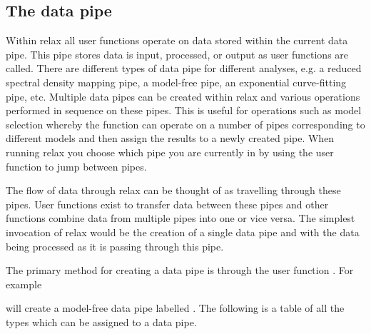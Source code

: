 
\subsection{The data pipe} \label{sect: the data pipe}

Within relax all user functions operate on data stored within the current data pipe.  This pipe stores data is input, processed, or output as user functions are called.  There are different types of data pipe for different analyses, e.g. a reduced spectral density mapping pipe, a model-free pipe, an exponential curve-fitting pipe, etc.  Multiple data pipes can be created within relax and various operations performed in sequence on these pipes.  This is useful for operations such as model selection whereby the function  can operate on a number of pipes corresponding to different models and then assign the results to a newly created pipe.  When running relax you choose which pipe you are currently in by using the  user function to jump between pipes. 

The flow of data through relax can be thought of as travelling through these pipes.  User functions exist to transfer data between these pipes and other functions combine data from multiple pipes into one or vice versa.  The simplest invocation of relax would be the creation of a single data pipe and with the data being processed as it is passing through this pipe.

The primary method for creating a data pipe is through the user function .  For example


will create a model-free data pipe labelled .  The following is a table of all the types which can be assigned to a data pipe.

